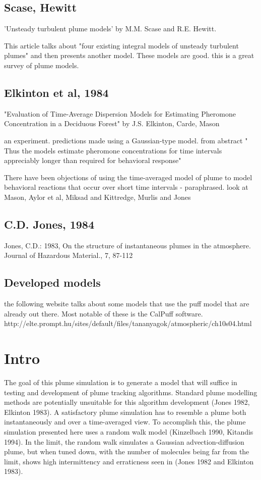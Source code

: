 \documentclass[11pt]{article} %
\begin{document}
\subsection{Scase, Hewitt}
 'Unsteady turbulent plume models' by M.M. Scase and R.E. Hewitt.

	This article talks about "four existing integral models of unsteady turbulent plumes" and then presents another model.  These models are good.  this is a great survey of plume models.

\subsection{Elkinton et al, 1984}
"Evaluation of Time-Average Dispersion Models for Estimating Pheromone Concentration in a Deciduous Forest" by J.S. Elkinton, Carde, Mason

	an experiment.  predictions made using a Gaussian-type model.
	from abstract " Thus the models estimate pheromone concentrations for time intervals appreciably longer than required for behavioral response"

	There have been objections of using the time-averaged model of plume to model behavioral reactions that occur over short time intervals - paraphrased.  look at Mason, Aylor et al, Miksad and Kittredge, Murlis and Jones
\subsection{ C.D. Jones, 1984}
	Jones, C.D.: 1983, On the structure of instantaneous plumes in the atmosphere.  Journal of Hazardous Material., 7, 87-112

\subsection{Developed models}
	the following website talks about some models that use the puff model that are already out there.  Most notable of these is the CalPuff software.  
 	http://elte.prompt.hu/sites/default/files/tananyagok/atmospheric/ch10s04.html
	



\section{Intro}

The goal of this plume simulation is to generate a model that will suffice in testing and development of plume tracking algorithms.  Standard plume modelling methods are potentially unsuitable for this algorithm development (Jones 1982, Elkinton 1983).  A satisfactory plume simulation has to resemble a plume both instantaneously and over a time-averaged view.  To accomplish this, the plume simulation presented here uses a random walk model (Kinzelbach 1990, Kitandis 1994).  In the limit, the random walk simulates a Gaussian advection-diffusion plume, but when tuned down, with the number of molecules being far from the limit, shows high intermittency and erraticness seen in (Jones 1982 and Elkinton 1983).
\end{document}
